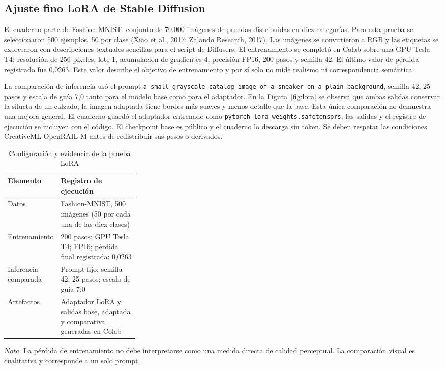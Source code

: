 \documentclass[12pt,letterpaper]{article}
\begin{document}
\subsection{Ajuste fino LoRA de Stable Diffusion}
El cuaderno \texttt{} parte de Fashion-MNIST, conjunto de 70.000 imágenes de prendas distribuidas en diez categorías. Para esta prueba se seleccionaron 500 ejemplos, 50 por clase (Xiao et al., 2017; Zalando Research, 2017). Las imágenes se convirtieron a RGB y las etiquetas se expresaron con descripciones textuales sencillas para el script \texttt{} de Diffusers. El entrenamiento se completó en Colab sobre una GPU Tesla T4: resolución de 256 píxeles, lote 1, acumulación de gradientes 4, precisión FP16, 200 pasos y semilla 42. El último valor de pérdida registrado fue 0,0263. Este valor describe el objetivo de entrenamiento y por sí solo no mide realismo ni correspondencia semántica.\par
La comparación de inferencia usó el prompt \texttt{a small grayscale catalog image of a sneaker on a plain background}, semilla 42, 25 pasos y escala de guía 7,0 tanto para el modelo base como para el adaptador. En la Figura~\ref{fig:lora} se observa que ambas salidas conservan la silueta de un calzado; la imagen adaptada tiene bordes más suaves y menos detalle que la base. Esta única comparación no demuestra una mejora general. El cuaderno guardó el adaptador entrenado como \texttt{pytorch\_lora\_weights.safetensors}; las salidas y el registro de ejecución se incluyen con el código. El checkpoint base es público y el cuaderno lo descarga sin token. Se deben respetar las condiciones CreativeML OpenRAIL-M antes de redistribuir sus pesos o derivados.

\begin{table}[H]
\caption{Configuración y evidencia de la prueba LoRA}
\label{tab:lora}
\begin{tabularx}{\linewidth}{p{0.30\linewidth}X}
\toprule
Elemento & Registro de ejecución \\
\midrule
Datos & Fashion-MNIST, 500 imágenes (50 por cada una de las diez clases) \\
Entrenamiento & 200 pasos; GPU Tesla T4; FP16; pérdida final registrada: 0,0263 \\
Inferencia comparada & Prompt fijo; semilla 42; 25 pasos; escala de guía 7,0 \\
Artefactos & Adaptador LoRA y salidas base, adaptada y comparativa generadas en Colab \\
\bottomrule
\end{tabularx}
\par\raggedright\vspace{5pt}\noindent\footnotesize\textit{Nota.} La pérdida de entrenamiento no debe interpretarse como una medida directa de calidad perceptual. La comparación visual es cualitativa y corresponde a un solo prompt.\normalsize
\end{table}
\end{document}
